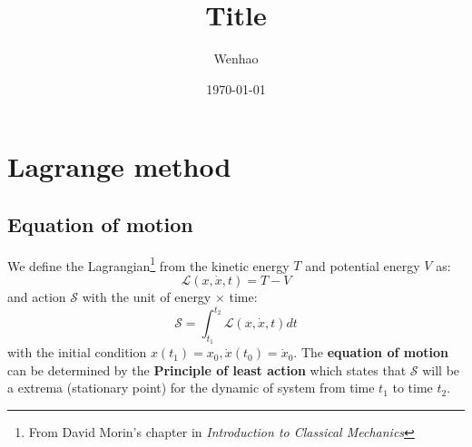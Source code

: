 \documentclass{article}
\renewcommand{\L}{\mathcal{L}}
\renewcommand{\S}{\mathcal{S}}
\begin{document}
\title{Title}
\author{Wenhao}
\date{\today}
\maketitle

\section{Lagrange method}
\subsection{Equation of motion}
We define the Lagrangian\footnote{From David Morin's chapter in \emph{Introduction to Classical Mechanics}} from the kinetic energy $T$ and potential energy $V$ as:
\begin{equation}
    \L(x,\dot{x},t) = T - V 
\end{equation}
and action $\S$ with the unit of energy $\times$ time:
\begin{equation}
    \S = \int_{t_1}^{t_2} \L(x,\dot{x},t) dt
\end{equation}
with the initial condition $x(t_1) = x_0, \dot{x}(t_0) = \dot{x}_0$. 
The \textbf{equation of motion} can be determined by the 
\textbf{Principle of least action} which states that $\S$ will be 
a extrema (stationary point) for the dynamic of system from time
$t_1$ to time $t_2$. 
\end{document}
